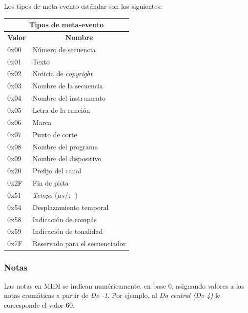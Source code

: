 \smallskip

Los tipos de meta-evento estándar son los siguientes:

\smallskip

\begin{center}
	\begin{tabular}{|l|l|}
		\hline \multicolumn{2}{|c|}{\textbf{Tipos de meta-evento}} \\
		\hline \multicolumn{1}{|c|}{\textbf{Valor}} & \multicolumn{1}{c|}{\textbf{Nombre}} \\
		\hline 0x00 & Número de secuencia \\
		\hline 0x01 & Texto \\
		\hline 0x02 & Noticia de \textit{copyright} \\
		\hline 0x03 & Nombre de la secuencia \\
		\hline 0x04 & Nombre del instrumento \\
		\hline 0x05 & Letra de la canción \\
		\hline 0x06 & Marca \\
		\hline 0x07 & Punto de corte \\
		\hline 0x08 & Nombre del programa \\
		\hline 0x09 & Nombre del dispositivo \\
		\hline 0x20 & Prefijo del canal \\
		\hline 0x2F & Fin de pista \\
		\hline 0x51 & \textit{Tempo} ($\mu s/\quarternote$) \\
		\hline 0x54 & Desplazamiento temporal \\
		\hline 0x58 & Indicación de compás \\
		\hline 0x59 & Indicación de tonalidad \\
		\hline 0x7F & Reservado para el secuenciador \\
		\hline 
	\end{tabular}
	\smallskip
\end{center}

\smallskip

\subsubsection{Notas}

Las notas en \acrshort{MIDI} se indican numéricamente, en base 0, asignando valores a las notas cromáticas a partir de \textit{Do -1}. Por ejemplo, al \textit{Do central (Do 4)} le corresponde el valor 60.

